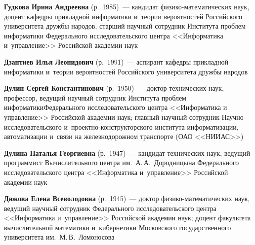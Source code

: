 \begin{multicols}{2}
\vspace*{6pt}

\noindent
\textbf{Гудкова Ирина Андреевна} (р.\ 1985)~--- кандидат 
фи\-зико-ма\-те\-ма\-ти\-че\-ских наук, доцент кафедры прикладной информатики
 и~тео\-рии вероятностей Российского университета дружбы народов; 
 старший\linebreak
  науч\-ный со\-труд\-ник Института проб\-лем информатики Федерального 
 исследовательского цент\-ра <<Информатика и~управ\-ле\-ние>> Российской академии наук
 
 \vspace*{6pt}
 
 
 
 \noindent
\textbf{Дзантиев Илья Леонидович} (р.\ 1991)~--- 
аспирант кафедры прикладной информатики и~тео\-рии 
вероятностей Российского университета дружбы народов

\vspace*{6pt}
 
  \noindent
\textbf{Дулин Сергей Константинович} (р.\ 1950)~--- 
доктор технических наук, профессор, ведущий научный сотрудник 
Института проб\-лем информатики\linebreak Федерального исследовательского центра 
<<Информатика и управ\-ле\-ние>> Российской академии наук;\linebreak 
главный научный сотрудник  На\-уч\-но-ис\-сле\-до\-ва\-тель\-ско\-го 
и~про\-ект\-но-кон\-ст\-рук\-тор\-ско\-го института информатизации, автоматизации 
и~связи на железнодорожном транспорте (ОАО <<НИИАС>>)
  
  \vspace*{6pt}
  
  \noindent
\textbf{Дулина Наталья Георгиевна} (р.\ 1947)~--- 
кандидат технических наук, ведущий программист Вы\-чис\-ли\-те\-ль\-но\-го центра им.\
 А.\,А.~Дородницына Федерального исследовательского центра <<Информатика и~управ\-ле\-ние>>
 Российской академии наук
 
\vspace*{6pt}
 
 \noindent
\textbf{Дюкова Елена Всеволодовна} (р.\ 1945)~---
 доктор фи\-зи\-ко-ма\-те\-ма\-ти\-че\-ских наук, 
ведущий научный сотрудник Федерального исследовательского центра 
<<Информатика и~управ\-ле\-ние>> Российской академии наук; 
доцент факультета вычислительной математики 
и~кибернетики Московского государственного университета им.\ М.\,В.~Ломоносова

\vspace*{6pt}


\end{multicols}
